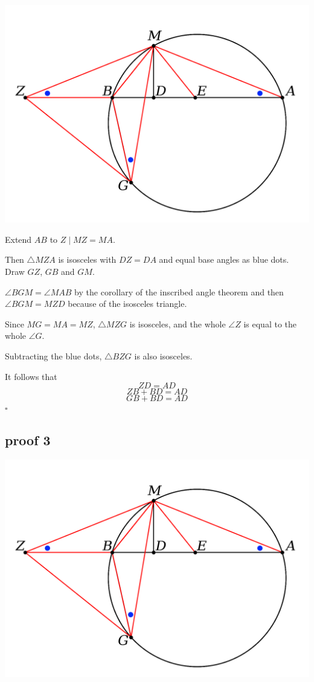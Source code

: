 \documentclass[11pt, oneside]{article}
\begin{document}
\begin{center} \includegraphics [scale=0.40] {bc2.png} \end{center}

Extend $AB$ to $Z \mid MZ = MA$.

Then $\triangle MZA$ is isosceles with $DZ = DA$ and equal base angles as blue dots.  Draw $GZ$, $GB$ and $GM$.

$\angle BGM = \angle MAB$ by the corollary of the inscribed angle theorem and then $\angle BGM = MZD$ because of the isosceles triangle.

Since $MG = MA = MZ$, $\triangle MZG$ is isosceles, and the whole $\angle Z$ is equal to the whole $\angle G$.

Subtracting the blue dots, $\triangle BZG$ is also isosceles.

It follows that 
\[ ZD = AD \]
\[ ZB + BD = AD \]
\[ GB + BD = AD \]
$\square$

\subsection*{proof 3}

\begin{center} \includegraphics [scale=0.40] {bc2.png} \end{center}
\end{document}
